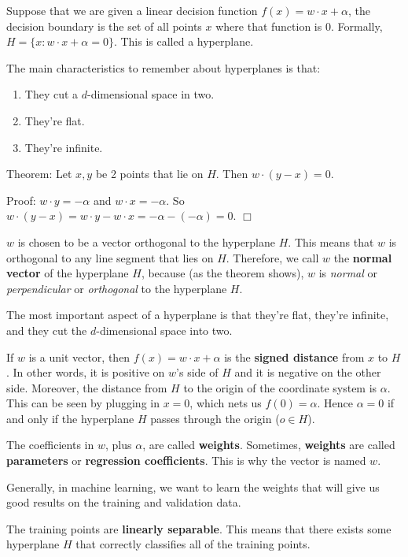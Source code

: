 Suppose that we are given a linear decision function
$f(x) = w \cdot x + \alpha$,
the decision boundary is the set of all points $x$ where that function is 0.
Formally, $H = \{x : w \cdot x + \alpha = 0\}$.
This is called a hyperplane.

The main characteristics to remember about hyperplanes is that:
\begin{enumerate}
    \item They cut a $d$-dimensional space in two.
    \item They're flat.
    \item They're infinite.
\end{enumerate}

Theorem: Let $x, y$ be 2 points that lie on $H$.
Then $w \cdot (y - x) = 0$.

Proof: $w \cdot y = -\alpha$ and $w \cdot x = -\alpha$.
So $w \cdot (y - x) = w \cdot y - w\cdot x = -\alpha - (-\alpha) = 0$. $\Box$


$w$ is chosen to be a vector orthogonal to the hyperplane $H$.
This means that $w$ is orthogonal to any line segment that lies on $H$.
Therefore, we call $w$ the \textbf{normal vector} of the hyperplane $H$, because (as the theorem shows), $w$ is \textit{normal} or \textit{perpendicular} or \textit{orthogonal} to the hyperplane $H$.



The most important aspect of a hyperplane is that they're flat, they're infinite, and they cut the $d$-dimensional space into two.

If $w$ is a unit vector, then $f(x) = w \cdot x + \alpha$ is the \textbf{signed distance} from $x$ to $H$.
In other words, it is positive on $w$'s side of $H$ and it is negative on the other side.
Moreover, the distance from $H$ to the origin of the coordinate system is $\alpha$.
This can be seen by plugging in $x = 0$, which nets us $f(0) = \alpha$.
Hence $\alpha = 0$ if and only if the hyperplane $H$ passes through the origin ($o \in H$).

The coefficients in $w$, plus $\alpha$, are called \textbf{weights}.
Sometimes, \textbf{weights} are called \textbf{parameters} or \textbf{regression coefficients}.
This is why the vector is named $w$.

Generally, in machine learning, we want to learn the weights that will give us good results on the training and validation data.

The training points are \textbf{linearly separable}.
This means that there exists some hyperplane $H$ that correctly classifies all of the training points.


